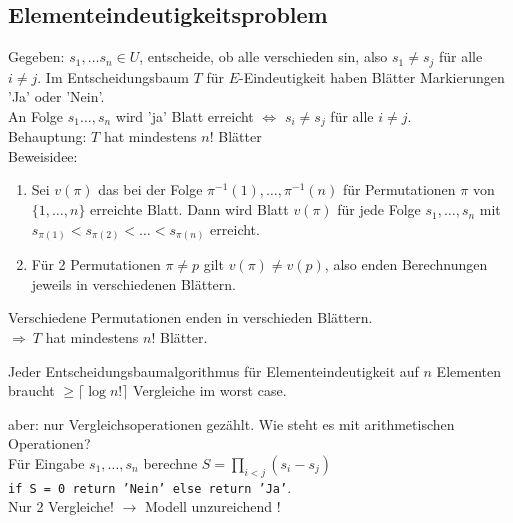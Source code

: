 \subsection{Elementeindeutigkeitsproblem}
Gegeben: $s_1,\ldots s_n \in U$, entscheide, ob alle verschieden sin, also $s_1 \ne s_j$ für alle $i \ne j$.
Im Entscheidungsbaum $T$ für $E$-Eindeutigkeit haben Blätter Markierungen 'Ja' oder 'Nein'.\\
An Folge $s_1 \ldots, s_n$ wird 'ja' Blatt erreicht $\Leftrightarrow$ $s_i \ne s_j$ für alle $i \ne j$.\\
Behauptung: $T$ hat mindestens $n!$ Blätter\\
Beweisidee:
\begin{enumerate}[1.]
\item Sei $v(\pi)$ das bei der Folge $\pi^{-1}(1),\ldots,\pi^{-1}(n)$ für Permutationen $\pi$ von $\{1,\ldots,n \}$ erreichte Blatt. Dann wird Blatt $v(\pi)$ für jede Folge $s_1,\ldots,s_n$ mit $s_{\pi(1)} < s_{\pi(2)} < \ldots < s_{\pi(n)}$ erreicht.
\item Für 2 Permutationen $\pi \ne p$ gilt $v(\pi) \ne v(p)$, also enden Berechnungen jeweils in verschiedenen Blättern.
\end{enumerate}
Verschiedene Permutationen enden in verschieden Blättern.\\
$\Rightarrow\ T$ hat mindestens $n!$ Blätter.
\begin{satz}
Jeder Entscheidungsbaumalgorithmus für Elementeindeutigkeit auf $n$ Elementen braucht $\geq \lceil \log n! \rceil$ Vergleiche im worst case.
\end{satz}
aber: nur Vergleichsoperationen gezählt. Wie steht es mit arithmetischen Operationen?\\
Für Eingabe $s_1,\ldots, s_n$ berechne $S = \prod_{i<j}(s_i-s_j)$\\
\texttt{if S = 0 return 'Nein' else return 'Ja'}.\\
Nur 2 Vergleiche! $\to$ Modell unzureichend !
